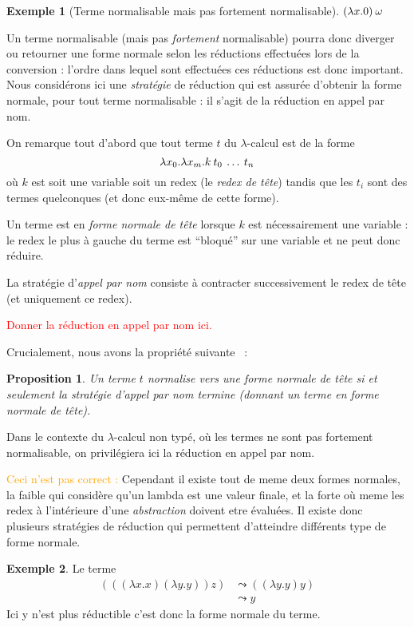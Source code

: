 \documentclass {article}
\newtheorem{proposition}{Proposition}
\theoremstyle{definition}
\newtheorem{example}{Exemple}
\theoremstyle{remark}
\newcommand{\todo}[1]{\textcolor{red}{#1}}
\newcommand{\attention}[1]{\textcolor{orange}{#1}}
\begin{document}
\begin{example}[Terme normalisable mais pas fortement normalisable]
  \todo{\((\lambda x. 0)\:\omega\)}
\end{example}

Un terme normalisable (mais pas \emph{fortement} normalisable) pourra
donc diverger ou retourner une forme normale selon les réductions
effectuées lors de la conversion : l'ordre dans lequel sont effectuées
ces réductions est donc important. Nous considérons ici une
\emph{stratégie} de réduction qui est assurée d'obtenir la forme
normale, pour tout terme normalisable : il s'agit de la réduction en
appel par nom.

On remarque tout d'abord que tout terme \(t\) du \(\lambda\)-calcul
est de la forme
%
\[
\lambda x_0. \lambda x_m. k\:t_0\:\ldots\:t_n
\]
%
où \(k\) est soit une variable soit un redex (le \emph{redex de tête})
tandis que les \(t_i\) sont des termes quelconques (et donc eux-même
de cette forme).


Un terme est en \emph{forme normale de tête} lorsque \(k\) est
nécessairement une variable : le redex le plus à gauche du terme est
``bloqué'' sur une variable et ne peut donc réduire.

La stratégie d'\emph{appel par nom} consiste à contracter
successivement le redex de tête (et uniquement ce redex). 

\todo{Donner la réduction en appel par nom ici.}

Crucialement, nous avons la propriété suivante~\citep[th.3,
  p.62]{krivine:lambda-calculus} :
%
\begin{proposition}
  Un terme \(t\) normalise vers une forme normale de tête si et
  seulement la stratégie d'appel par nom termine (donnant un terme en
  forme normale de tête).
\end{proposition}

Dans le contexte du \(\lambda\)-calcul non typé, où les termes ne sont
pas fortement normalisable, on privilégiera ici la réduction en appel
par nom.

\attention{Ceci n'est pas correct :} Cependant il
existe tout de meme deux formes normales, la faible qui considère
qu'un lambda est une valeur finale, et la forte où meme les redex à
l'intérieure d'une \emph{abstraction} doivent etre évaluées.  Il
existe donc plusieurs stratégies de réduction qui permettent
d'atteindre différents type de forme normale.

\begin{example}
  Le terme 
  \begin{align*}
    (((\lambda x.x) (\lambda y.y)) z) &\leadsto ((\lambda y.y) y) \\
    & \leadsto y
  \end{align*}
  Ici y n'est plus réductible c'est donc la forme normale du terme.
\end{example}
\end{document}
